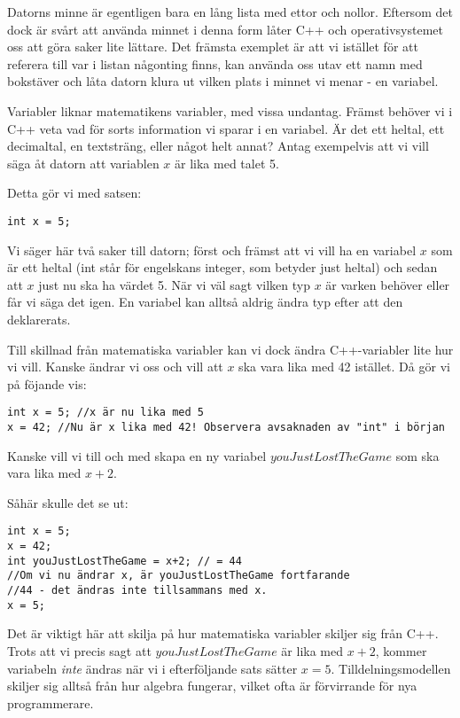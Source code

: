 Datorns minne är egentligen bara en lång lista med ettor och nollor. Eftersom det dock är svårt att använda minnet i denna form låter C++ och operativsystemet oss att göra saker lite lättare. Det främsta exemplet är att vi istället för att referera till var i listan någonting finns, kan använda oss utav ett namn med bokstäver och låta datorn klura ut vilken plats i minnet vi menar - en variabel.

Variabler liknar matematikens variabler, med vissa undantag. Främst behöver vi i C++ veta vad för sorts information vi sparar i en variabel. Är det ett heltal, ett decimaltal, en textsträng, eller något helt annat? Antag exempelvis att vi vill säga åt datorn att variablen $x$ är lika med talet 5.

Detta gör vi med satsen:
\begin{lstlisting}
int x = 5;
\end{lstlisting}

Vi säger här två saker till datorn; först och främst att vi vill ha en variabel $x$ som är ett heltal (int står för engelskans integer, som betyder just heltal) och sedan att $x$ just nu ska ha värdet 5. När vi väl sagt vilken typ $x$ är varken behöver eller får vi säga det igen. En variabel kan alltså aldrig ändra typ efter att den deklarerats.

Till skillnad från matematiska variabler kan vi dock ändra C++-variabler lite hur vi vill. Kanske ändrar vi oss och vill att $x$ ska vara lika med 42 istället. Då gör vi på föjande vis:

\begin{lstlisting}
int x = 5; //x är nu lika med 5
x = 42; //Nu är x lika med 42! Observera avsaknaden av "int" i början
\end{lstlisting}

Kanske vill vi till och med skapa en ny variabel $youJustLostTheGame$ som ska vara lika med $x+2$.

Såhär skulle det se ut:

\begin{lstlisting}
int x = 5;
x = 42;
int youJustLostTheGame = x+2; // = 44
//Om vi nu ändrar x, är youJustLostTheGame fortfarande
//44 - det ändras inte tillsammans med x.
x = 5;
\end{lstlisting}

Det är viktigt här att skilja på hur matematiska variabler skiljer sig från C++. Trots att vi precis sagt att $youJustLostTheGame$ är lika med $x+2$, kommer variabeln \emph{inte} ändras när vi i efterföljande sats sätter $x = 5$. Tilldelningsmodellen skiljer sig alltså från hur algebra fungerar, vilket ofta är förvirrande för nya programmerare.

